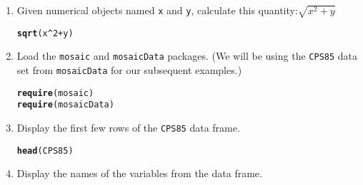 \documentclass[10pt]{article}\usepackage[]{graphicx}\usepackage[]{color}
\makeatletter
\newcommand{\hlnum}[1]{\textcolor[rgb]{0.686,0.059,0.569}{#1}}%
\newcommand{\hlopt}[1]{\textcolor[rgb]{0,0,0}{#1}}%
\newcommand{\hlstd}[1]{\textcolor[rgb]{0.345,0.345,0.345}{#1}}%
\newcommand{\hlkwd}[1]{\textcolor[rgb]{0.737,0.353,0.396}{\textbf{#1}}}%
\newenvironment{kframe}{%
 \def\at@end@of@kframe{}%
 \ifinner\ifhmode%
  \def\at@end@of@kframe{\end{minipage}}%
  \begin{minipage}{\columnwidth}%
 \fi\fi%
 \def\FrameCommand##1{\hskip\@totalleftmargin \hskip-\fboxsep
 \colorbox{shadecolor}{##1}\hskip-\fboxsep
     \hskip-\linewidth \hskip-\@totalleftmargin \hskip\columnwidth}%
 \MakeFramed {\advance\hsize-\width
   \@totalleftmargin\z@ \linewidth\hsize
   \@setminipage}}%
 {\par\unskip\endMakeFramed%
 \at@end@of@kframe}
\newenvironment{knitrout}{}{} %
\makeatother
\begin{document}




\begin{enumerate}
  \item Given numerical objects named \texttt{x} and \texttt{y}, calculate this quantity:$ \sqrt{x^2 + y}$ 
\begin{knitrout}
\color{fgcolor}\begin{kframe}
\begin{alltt}
\hlkwd{sqrt}\hlstd{(x}\hlopt{^}\hlnum{2} \hlopt{+} \hlstd{y)}
\end{alltt}
\end{kframe}
\end{knitrout}

\item
Load the \texttt{mosaic} and \texttt{mosaicData} packages.  (We will be using the 
\texttt{CPS85} data set from \texttt{mosaicData} for our subsequent examples.)
\begin{knitrout}
\color{fgcolor}\begin{kframe}
\begin{alltt}
\hlkwd{require}\hlstd{(mosaic)}
\hlkwd{require}\hlstd{(mosaicData)}
\end{alltt}
\end{kframe}
\end{knitrout}

\item Display the first few rows of the \texttt{CPS85} data frame.


\begin{knitrout}
\color{fgcolor}\begin{kframe}
\begin{alltt}
\hlkwd{head}\hlstd{(CPS85)}
\end{alltt}
\end{kframe}
\end{knitrout}

\item Display the names of the variables from the data frame.


\end{enumerate}
\end{document}
